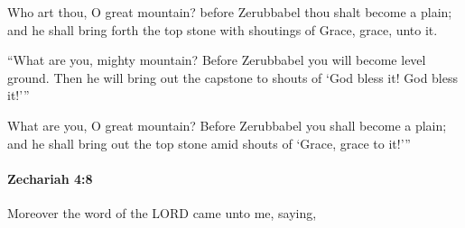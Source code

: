 			\begin{versebox}
					\item[BHS] 
					\item[LXX] 
					\item[ASV] Who art thou, O great mountain? before Zerubbabel thou shalt become a plain; and he shall bring forth the top stone with shoutings of Grace, grace, unto it.
					\item[NIV] “What are you, mighty mountain? Before Zerubbabel you will become level ground. Then he will bring out the capstone to shouts of ‘God bless it! God bless it!’”
					\item[NRSV] What are you, O great mountain? Before Zerubbabel you shall become a plain; and he shall bring out the top stone amid shouts of ‘Grace, grace to it!’”
			\end{versebox}

		\paragraph{Zechariah 4:8} %
			\label{ZECHARIAH-4-8}

			Moreover the word of the LORD came unto me, saying,

